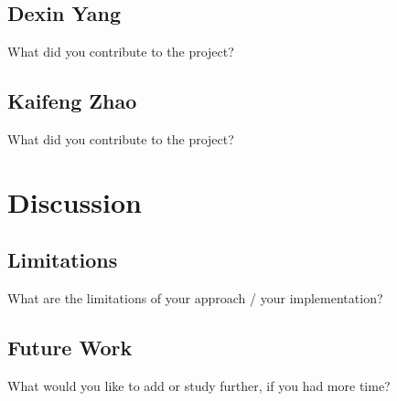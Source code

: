 \documentclass[10pt,twocolumn]{article}
\begin{document}
\subsection{Dexin Yang}
What did you contribute to the project?

\subsection{Kaifeng Zhao}
What did you contribute to the project?

\section{Discussion}

\subsection{Limitations}
What are the limitations of your approach / your implementation?

\subsection{Future Work}
What would you like to add or study further, if you had more time?




\end{document}
